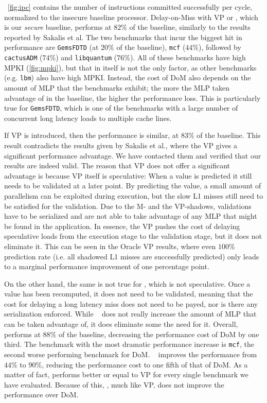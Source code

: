 ~\autoref{fig:ipc} contains the number of instructions committed successfully per cycle, normalized to the insecure baseline processor. Delay-on-Miss with VP or \recomp, which is our \emph{secure} baseline, performs at $82\%$ of the baseline, similarly to the results reported by Sakalis et al. The two benchmarks that incur the biggest hit in performance are \texttt{GemsFDTD} (at $20\%$ of the baseline), \texttt{mcf} ($44\%$), followed by \texttt{cactusADM} ($74\%$) and \texttt{libquantum} ($76\%$). All of these benchmarks have high MPKI (\autoref{fig:mpki}), but that in itself is not the only factor, as other benchmarks (e.g. \texttt{lbm}) also have high MPKI. Instead, the cost of DoM also depends on the amount of MLP that the benchmarks exhibit; the more the MLP taken advantage of in the baseline, the higher the performance loss. This is particularly true for \texttt{GemsFDTD}, which is one of the benchmarks with a large number of concurrent long latency loads to multiple cache lines.

If VP is introduced, then the performance is similar, at $83\%$ of the baseline.
This result contradicts the results given by Sakalis et al., where the VP gives a significant performance advantage. We have contacted them and verified that our results are indeed valid. %
The reason that VP does not offer a significant advantage is because VP itself is speculative: When a value is predicted it still needs to be validated at a later point. By predicting the value, a small amount of parallelism can be exploited during execution, but the slow L1 misses still need to be satisfied for the validation. Due to the M- and the VP-shadows, validations have to be serialized and are not able to take advantage of any MLP that might be found in the application. In essence, the VP pushes the cost of delaying speculative loads from the execution stage to the validation stage, but it does not eliminate it. This can be seen in the Oracle VP results, where even $100\%$ prediction rate (i.e. all shadowed L1 misses are successfully predicted) only leads to a marginal performance improvement of one percentage point.

On the other hand, the same is not true for \recomp, which is not speculative. Once a value has been recomputed, it does not need to be validated, meaning that the cost for delaying a long latency miss does not need to be payed, nor is there any serialization enforced. While \recomp~ does not really increase the amount of MLP that can be taken advantage of, it does eliminate some the need for it. Overall, \recomp~ performs at $88\%$ of the baseline, decreasing the performance cost of DoM by one third. The benchmark with the most dramatic performance increase is \texttt{mcf}, the second worse performing benchmark for DoM. \recomp~ improves the performance from $44\%$ to $90\%$, reducing the performance cost to one fifth of that of DoM. As a matter of fact, \recomp performs better or equal to VP for every single benchmark we have evaluated.  Because of this, \recomp, much like VP, does not improve the performance over DoM.

